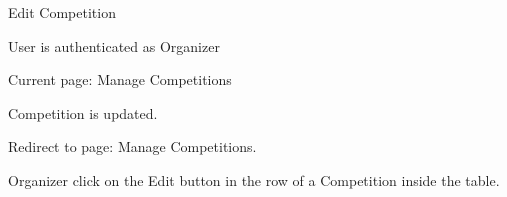 \begin{uc}{Edit Competition}
\begin{uc-ext}
    \end{uc-ext}

    \begin{uc-pre}
    \item User is authenticated as Organizer
    \item Current page: Manage Competitions
    \end{uc-pre}

    \begin{uc-post}
    \item Competition is updated.
    \item Redirect to page: Manage Competitions.
    \end{uc-post}

    \begin{uc-trig}
        Organizer click on the Edit button in the row of a Competition inside the
        table.
    \end{uc-trig}

\end{uc}
